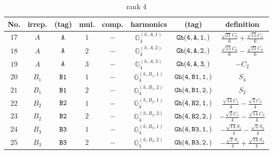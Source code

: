 \documentclass[fleqn,8pt]{jsarticle}
\begin{document}
\begin{table}[ht!]
\begin{center}
\caption{rank 4}
\renewcommand{\arraystretch}{1.3}
\begin{tabular}{cccccccc} \hline \hline
No. & irrep. & (tag) & mul. & comp. & harmonics & (tag) & definition \\ \hline
$ 17 $ & $ A $ & $ {\tt A} $ & $ 1 $ & $ - $ & $ \mathbb{G}_{4}^{(h,A,1)} $ & $ {\tt Gh(4,A,1,)} $ & $ \frac{\sqrt{21} C_{0}}{6} + \frac{\sqrt{15} C_{4}}{6} $ \\
$ 18 $ & $ A $ & $ {\tt A} $ & $ 2 $ & $ - $ & $ \mathbb{G}_{4}^{(h,A,2)} $ & $ {\tt Gh(4,A,2,)} $ & $ \frac{\sqrt{15} C_{0}}{6} - \frac{\sqrt{21} C_{4}}{6} $ \\
$ 19 $ & $ A $ & $ {\tt A} $ & $ 3 $ & $ - $ & $ \mathbb{G}_{4}^{(h,A,3)} $ & $ {\tt Gh(4,A,3,)} $ & $ - C_{2} $ \\
$ 20 $ & $ B_{1} $ & $ {\tt B1} $ & $ 1 $ & $ - $ & $ \mathbb{G}_{4}^{(h,B_{1},1)} $ & $ {\tt Gh(4,B1,1,)} $ & $ S_{4} $ \\
$ 21 $ & $ B_{1} $ & $ {\tt B1} $ & $ 2 $ & $ - $ & $ \mathbb{G}_{4}^{(h,B_{1},2)} $ & $ {\tt Gh(4,B1,2,)} $ & $ S_{2} $ \\
$ 22 $ & $ B_{2} $ & $ {\tt B2} $ & $ 1 $ & $ - $ & $ \mathbb{G}_{4}^{(h,B_{2},1)} $ & $ {\tt Gh(4,B2,1,)} $ & $ \frac{\sqrt{14} C_{1}}{4} - \frac{\sqrt{2} C_{3}}{4} $ \\
$ 23 $ & $ B_{2} $ & $ {\tt B2} $ & $ 2 $ & $ - $ & $ \mathbb{G}_{4}^{(h,B_{2},2)} $ & $ {\tt Gh(4,B2,2,)} $ & $ - \frac{\sqrt{2} C_{1}}{4} - \frac{\sqrt{14} C_{3}}{4} $ \\
$ 24 $ & $ B_{3} $ & $ {\tt B3} $ & $ 1 $ & $ - $ & $ \mathbb{G}_{4}^{(h,B_{3},1)} $ & $ {\tt Gh(4,B3,1,)} $ & $ - \frac{\sqrt{14} S_{1}}{4} - \frac{\sqrt{2} S_{3}}{4} $ \\
$ 25 $ & $ B_{3} $ & $ {\tt B3} $ & $ 2 $ & $ - $ & $ \mathbb{G}_{4}^{(h,B_{3},2)} $ & $ {\tt Gh(4,B3,2,)} $ & $ - \frac{\sqrt{2} S_{1}}{4} + \frac{\sqrt{14} S_{3}}{4} $ \\
 \hline \hline
\end{tabular}
\end{center}
\end{table}
\end{document}
